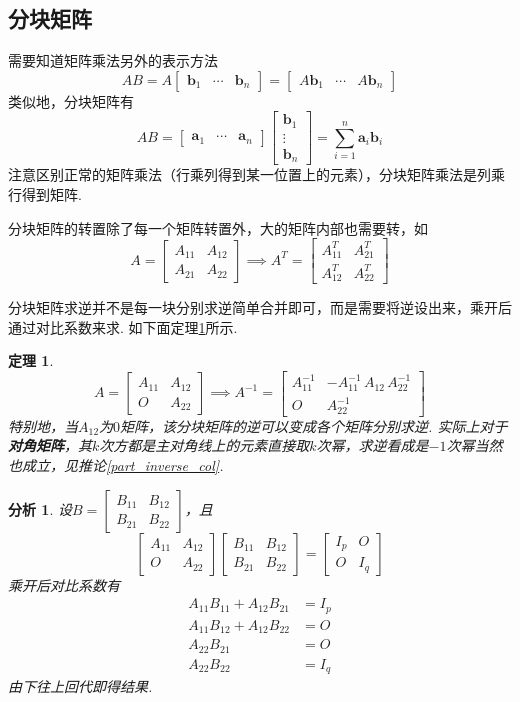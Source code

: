 \documentclass[11pt,UTF8]{ctexart}
\newtheorem{theorem}{定理}
\newtheorem*{analysis}{分析}
\newcommand{\vb}[1]{\mathbf{#1}}
\newcommand{\bmat}[2]{\begin{bmatrix}{#1}&\cdots&{#2}\end{bmatrix}}
\begin{document}
\subsection{分块矩阵}
\par 需要知道矩阵乘法另外的表示方法
\[AB=A\bmat{\vb{b}_1}{\vb{b}_n}=\bmat{A\vb{b}_1}{A\vb{b}_n}\]
类似地，分块矩阵有
\[AB=\bmat{\vb{a}_1}{\vb{a}_n}\begin{bmatrix}\vb{b}_1\\\vdots\\\vb{b}_n\end{bmatrix}=\sum_{i=1}^n\vb{a}_i\vb{b}_i\]
注意区别正常的矩阵乘法（行乘列得到某一位置上的元素），分块矩阵乘法是列乘行得到矩阵.
\par 分块矩阵的转置除了每一个矩阵转置外，大的矩阵内部也需要转，如
\[A=\begin{bmatrix}A_{11}&A_{12}\\A_{21}&A_{22}\end{bmatrix}\implies A^T=\begin{bmatrix}A_{11}^T&A_{21}^T\\A_{12}^T&A_{22}^T\end{bmatrix}\]
\par 分块矩阵求逆并不是每一块分别求逆简单合并即可，而是需要将逆设出来，乘开后通过对比系数来求. 如下面定理\ref{part_inverse}所示.
\begin{theorem}
\label{part_inverse}
\[A=\begin{bmatrix}A_{11}&A_{12}\\O&A_{22}\end{bmatrix}\implies A^{-1}=\begin{bmatrix}A_{11}^{-1}&-A_{11}^{-1}\,A_{12}\,A_{22}^{-1}\\O&A_{22}^{-1}\end{bmatrix}\]
特别地，当$A_{12}$为$0$矩阵，该分块矩阵的逆可以变成各个矩阵分别求逆. 实际上对于\textbf{对角矩阵}，其$k$次方都是主对角线上的元素直接取$k$次幂，求逆看成是$-1$次幂当然也成立，见推论\ref{part_inverse_col}.
\end{theorem}
\begin{analysis}
设$B=\begin{bmatrix}B_{11}&B_{12}\\B_{21}&B_{22}\end{bmatrix}$，且
\[\begin{bmatrix}A_{11}&A_{12}\\O&A_{22}\end{bmatrix}\begin{bmatrix}B_{11}&B_{12}\\B_{21}&B_{22}\end{bmatrix}=\begin{bmatrix}I_p&O\\O&I_q\end{bmatrix}\]
乘开后对比系数有
\[\begin{aligned}
A_{11}B_{11}+A_{12}B_{21}&=I_p\\
A_{11}B_{12}+A_{12}B_{22}&=O\\
A_{22}B_{21}&=O\\
A_{22}B_{22}&=I_q\end{aligned}\]
由下往上回代即得结果.
\end{analysis}
\end{document}
